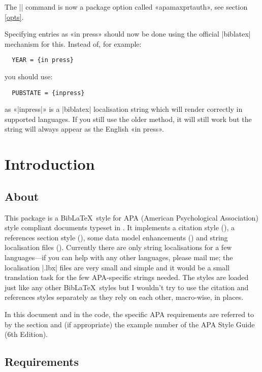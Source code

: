 \documentclass{ltxdockit}
\begin{document}
The |\maxprtauth| command is now a package option called
«apamaxprtauth», see section \ref{opts}.

Specifying entries as «in press» should now be done using the official |biblatex|
mechanism for this. Instead of, for example:

\begin{verbatim}
  YEAR = {in press}
\end{verbatim}

\noindent you should use:

\begin{verbatim}
  PUBSTATE = {inpress}
\end{verbatim}

\noindent as «|inpress|» is a |biblatex| localisation string which will
render correctly in supported languages. If you still use the older method,
it will still work but the string will always appear as the English «in
press».

\section{Introduction}\label{int}

\subsection{About}

This package is a Bib\LaTeX\ style for APA (American Psychological
Association) style compliant documents typeset in \latex. It implements a
citation style (), a references section style
(), some data model enhancements () and string
localisation files (). Currently there are only
string localisations for a few languages---if you can help with any other
languages, please mail me; the localisation |.lbx| files are very small and
simple and it would be a small translation task for the few APA-specific
strings needed. The styles are loaded just like any other Bib\LaTeX\ styles
but I wouldn't try to use the citation and references styles separately as
they rely on each other, macro-wise, in places.

In this document and in the code, the specific APA requirements are
referred to by the section and (if appropriate) the example number of the
APA Style Guide (6th Edition).

\subsection{Requirements}\label{ref:req}
\end{document}
